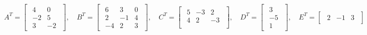 \documentclass{article}
\begin{document}
\begin{equation*}
    A^T = \begin{bmatrix}
        \begin{array}{rrr}
            4 & 0 \\ 
            -2 & 5 \\
            3 & -2
        \end{array}
    \end{bmatrix}
    , \quad B^T = \begin{bmatrix}
        \begin{array}{rrr}
            6 & 3 & 0\\ 
            2 & -1 & 4\\
            -4 & 2 & 3
        \end{array}
    \end{bmatrix}
    , \quad C^T = \begin{bmatrix}
        \begin{array}{rrr}
            5 & -3 & 2\\ 
            4 & 2 & -3\\
        \end{array}
    \end{bmatrix}
    , \quad D^T = \begin{bmatrix}
        \begin{array}{r}
            3 \\
            -5\\ 
            1
        \end{array}
    \end{bmatrix}
    , \quad E^T = \begin{bmatrix}
        \begin{array}{rrr}
            2 & -1 & 3
        \end{array}
    \end{bmatrix}
\end{equation*}
\end{document}
